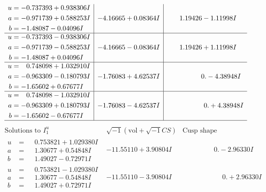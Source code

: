 \documentclass[1p]{elsarticle_modified}
\theoremstyle{definition}
\newcommand{\I}{\sqrt{-1}}
\begin{document}
$$\begin{array}{c|c|c}
\begin{aligned}
u &= -0.737393 + 0.938306 I \\
a &= -0.971739 + 0.588253 I \\
b &= -1.48087 - 0.04096 I\end{aligned}
 & -4.16665 + 0.08364 I & \phantom{-}1.19426 - 1.11998 I \\ \hline\begin{aligned}
u &= -0.737393 - 0.938306 I \\
a &= -0.971739 - 0.588253 I \\
b &= -1.48087 + 0.04096 I\end{aligned}
 & -4.16665 - 0.08364 I & \phantom{-}1.19426 + 1.11998 I \\ \hline\begin{aligned}
u &= \phantom{-}0.748098 + 1.032910 I \\
a &= -0.963309 - 0.180793 I \\
b &= -1.65602 + 0.67677 I\end{aligned}
 & -1.76083 + 4.62537 I & \phantom{-0.000000 } 0. - 4.38948 I \\ \hline\begin{aligned}
u &= \phantom{-}0.748098 - 1.032910 I \\
a &= -0.963309 + 0.180793 I \\
b &= -1.65602 - 0.67677 I\end{aligned}
 & -1.76083 - 4.62537 I & \phantom{-0.000000 -}0. + 4.38948 I\\
 \hline 
 \end{array}$$\newpage$$\begin{array}{c|c|c}  
\text{Solutions to }I^u_{1}& \I (\text{vol} + \sqrt{-1}CS) & \text{Cusp shape}\\
 \hline 
\begin{aligned}
u &= \phantom{-}0.753821 + 1.029380 I \\
a &= \phantom{-}1.30677 + 0.54848 I \\
b &= \phantom{-}1.49027 - 0.72971 I\end{aligned}
 & -11.55110 + 3.90804 I & \phantom{-0.000000 } 0. - 2.96330 I \\ \hline\begin{aligned}
u &= \phantom{-}0.753821 - 1.029380 I \\
a &= \phantom{-}1.30677 - 0.54848 I \\
b &= \phantom{-}1.49027 + 0.72971 I\end{aligned}
 & -11.55110 - 3.90804 I & \phantom{-0.000000 -}0. + 2.96330 I \\ \hline\begin{aligned}

\end{aligned}
\end{array}$$
\end{document}
